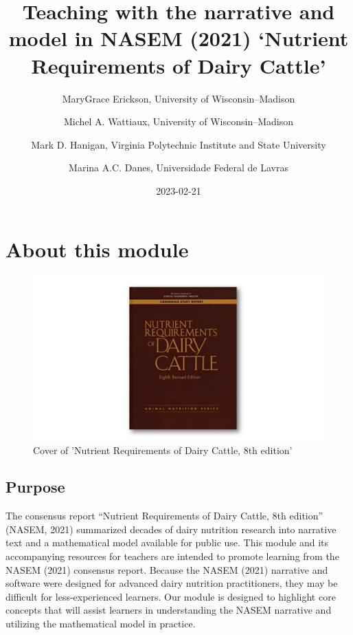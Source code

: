 \documentclass[
]{book}
\title{Teaching with the narrative and model in NASEM (2021) `Nutrient Requirements of Dairy Cattle'}
\author{MaryGrace Erickson, University of Wisconsin--Madison \and Michel A. Wattiaux, University of Wisconsin--Madison \and Mark D. Hanigan, Virginia Polytechnic Institute and State University \and Marina A.C. Danes, Universidade Federal de Lavras}
\date{2023-02-21}
\begin{document}
\maketitle

{
\setcounter{tocdepth}{1}
\tableofcontents
}
\hypertarget{about-this-module}{%
\chapter{About this module}\label{about-this-module}}

\begin{figure}

{\centering \includegraphics[width=55.56in]{images/nasem_book} 

}

\caption{Cover of 'Nutrient Requirements of Dairy Cattle, 8th edition'}\label{fig:unnamed-chunk-1}
\end{figure}

\hypertarget{purpose}{%
\section{Purpose}\label{purpose}}

The consensus report ``Nutrient Requirements of Dairy Cattle, 8th edition'' (NASEM, 2021) summarized decades of dairy nutrition research into narrative text and a mathematical model available for public use. This module and its accompanying resources for teachers are intended to promote learning from the NASEM (2021) consensus report. Because the NASEM (2021) narrative and software were designed for advanced dairy nutrition practitioners, they may be difficult for less-experienced learners. Our module is designed to highlight core concepts that will assist learners in understanding the NASEM narrative and utilizing the mathematical model in practice.
\end{document}
